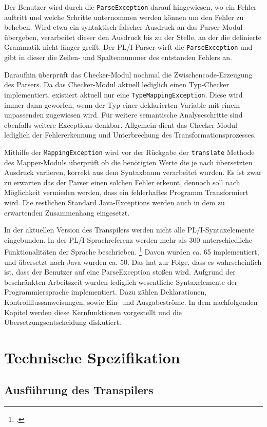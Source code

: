Der Benutzer wird durch die \verb+ParseException+ darauf hingewiesen, wo ein Fehler auftritt und welche Schritte unternommen werden können um den Fehler zu beheben.
Wird etwa ein syntaktisch falscher Ausdruck an das Parser-Modul übergeben, verarbeitet dieser den Ausdruck
bis zu der Stelle, an der die definierte Grammatik nicht länger greift.
Der PL/I-Parser wirft die \verb+ParseException+ und gibt in dieser die Zeilen- und Spaltennummer des
entstanden Fehlers an.

Daraufhin überprüft das Checker-Modul nochmal die Zwischencode-Erzeugung des Parsers.
Da das Checker-Modul aktuell lediglich einen Typ-Checker implementiert, existiert aktuell nur eine \verb+TypeMappingException+.
Diese wird immer dann geworfen, wenn der Typ einer deklarierten Variable mit einem unpassenden zugewiesen wird.
Für weitere semantische Analyseschritte sind ebenfalls weitere Exceptions denkbar. Allgemein dient das Checker-Modul lediglich der Fehlererkennung und Unterbrechung des Transformationsprozesses.

Mithilfe der \verb+MappingException+ wird vor der Rückgabe der \verb+translate+ Methode des Mapper-Moduls überprüft ob 
die benötigten Werte die je nach übersetzten Ausdruck variieren, korrekt aus dem Syntaxbaum verarbeitet wurden.
Es ist zwar zu erwarten das der Parser einen solchen Fehler erkennt, dennoch soll nach Möglichkeit vermieden werden, dass ein fehlerhaftes Programm Transformiert wird. Die restlichen Standard Java-Exceptions werden auch in dem zu erwartenden Zusammenhang eingesetzt.

In der aktuellen Version des Transpilers werden nicht alle PL/I-Syntaxelemente eingebunden.
In der PL/I-Sprachreferenz werden mehr als 300 unterschiedliche Funktionalitäten der Sprache beschrieben. \footcite[Vgl. ][S. 5ff.]{pliref}
Davon wurden ca. 65 implementiert, und übersetzt nach Java wurden ca. 50.
Das hat zur Folge, dass es wahrscheinlich ist, dass der Benutzer auf eine ParseException stoßen wird.
Aufgrund der beschränkten Arbeitszeit wurden lediglich wesentliche Syntaxelemente der Programmiersprache implementiert.
Dazu zählen Deklarationen, Kontrollflussanweisungen, sowie Ein- und Ausgabeströme.
In dem nachfolgenden Kapitel werden diese Kernfunktionen vorgestellt und die Übersetzungsentscheidung
diskutiert. 

\pagebreak
\section{Technische Spezifikation}
\subsection{Ausführung des Transpilers}

